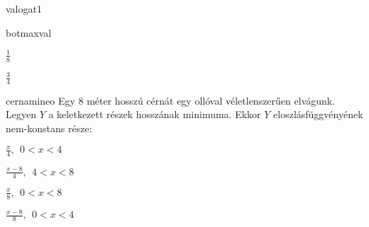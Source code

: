 \documentclass[12pt]{article}
\begin{document}
\begin{quiz}{valogat1}
\begin{multi}{botmaxval}
\item $ \frac{1}{8} $
\item $ \frac{3}{4} $
\end{multi}
\begin{multi}{cernamineo}
Egy $ 8 $ méter hosszú cérnát egy ollóval véletlenszerűen elvágunk.
Legyen $ Y $ a keletkezett részek hosszának minimuma.
Ekkor $ Y $ eloszlásfüggvényének nem-konstans része:
\item* $ \frac{x}{4},\:\: 0<x<4 $
\item $ \frac{x-8}{4},\:\: 4<x<8 $
\item $ \frac{x}{8},\:\: 0<x<8 $
\item $ \frac{x-8}{8},\:\: 0<x<4 $
\end{multi}
\end{quiz}
\end{document}
